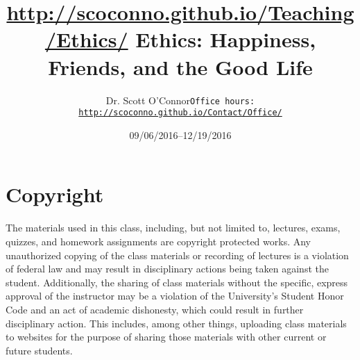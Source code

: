 \documentclass[article,oneside]{memoir}
\def\myauthor{Author}
\def\mytitle{Title}
\def\mycopyright{\myauthor}
\def\myweb{\href{http://scoconno.github.io/Teaching/Ethics/}{http://scoconno.github.io/Teaching/Ethics/}}
\def\myauthor{Dr. Scott O'Connor}
\def\mytitle{{\normalsize \myweb \newline} \HUGE Ethics: Happiness, Friends, and the Good Life}
\begin{document}
\setsansfont[Mapping=tex-text]{Myriad Pro} 
\setmonofont[Mapping=tex-text,Scale=0.8]{Georgia} 

\def\ind{\hangindent=1 true cm\hangafter=1 \noindent}
\def\labelitemi{$\cdot$}


\title{\LARGE \mytitle}     
\author{\Large\myauthor \newline \footnotesize\texttt{\noindent Office hours: \href{http://scoconno.github.io/Contact/Office/}{http://scoconno.github.io/Contact/Office/}}}
\date{09/06/2016--12/19/2016}


\maketitle




%
%

\section{Copyright}
The materials used in this class, including, but not limited to, lectures, exams, quizzes, and homework assignments are copyright protected works.  Any unauthorized copying of the class materials or recording of lectures is a violation of federal law and may result in disciplinary actions being taken against the student.  Additionally, the sharing of class materials without the specific, express approval of the instructor may be a violation of the University's Student Honor Code and an act of academic dishonesty, which could result in further disciplinary action.  This includes, among other things, uploading class materials to websites for the purpose of sharing those materials with other current or future students. 
\end{document}
